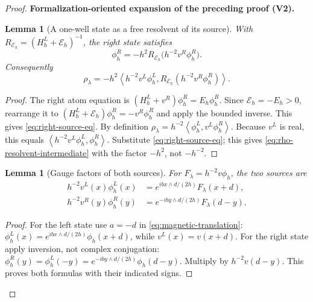 \documentclass[11pt]{article}
\newtheorem{lemma}[theorem]{Lemma}
\newcommand{\formalisationparentid}{X}
\newenvironment{formalisationaddition}[1]{\par\medskip\begingroup\color{blue}\def\formalisationparentid{#1}\setcounter{formalizationsublemma}{0}\let\lemma\formalizationsublemma\let\endlemma\endformalizationsublemma
  \def\Eo{\mathcal E_h^\circ}\def\EE{\mathcal E_h}\def\phio{\phi_h^\circ}\def\phih{\phi_h}\def\Ho{H_h^{\rm atom}(v^\circ)}\def\Ha{H_h^{\rm atom}}\def\HL{H_h^{L}}\def\Dh{D_h}\def\Log{\operatorname{Log}}\def\ellh{\ell_h}\def\Gp{G_{p,h}}\def\Ast{A_{*,h}}\def\ahat{\widehat{\mathfrak a}_h}\def\ah{\mathfrak a_h}\def\rh{\widehat\rho_h}\def\deltah{\widehat\delta_h}\def\oldref##1{\textup{(##1)}}\def\interface##1{\par\noindent\textit{Analytical interface used here.} ##1\par}\def\finish{\par\noindent\textit{Conclusion of the formalization-oriented expansion.} }\par\noindent\textbf{Formalization-oriented expansion of the preceding proof (V2).}\par\smallskip
}{\par\endgroup\medskip
}
\newcommand{\ip}[2]{\left\langle #1,#2\right\rangle}
\begin{document}
\begin{proof}
\begin{formalisationaddition}{P5.1}
\begin{lemma}[A one-well state as a free resolvent of its source]\label{sublemma:P5-1-source-resolvent}
With $R_{\mathcal E_h}=(\HL+\mathcal E_h)^{-1}$, the right state satisfies
\begin{equation*}
 \phi_h^R=-h^2R_{\mathcal E_h}\big(h^{-2}v^R\phi_h^R\big).
\end{equation*}
Consequently
\begin{equation*}
 \rho_\lambda=-h^2\ip{h^{-2}v^L\phi_h^L}
 {R_{\mathcal E_h}(h^{-2}v^R\phi_h^R)}.
\end{equation*}
\end{lemma}
\begin{proof}
The right atom equation is $(\HL+v^R)\phi_h^R=E_h\phi_h^R$. Since $\mathcal E_h=-E_h>0$, rearrange it to
$(\HL+\mathcal E_h)\phi_h^R=-v^R\phi_h^R$ and apply the bounded inverse. This gives \eqref{eq:right-source-eq}.
By definition $\rho_\lambda=h^{-2}\ip{\phi_h^L}{v^L\phi_h^R}$.
Because $v^L$ is real, this equals
$\ip{h^{-2}v^L\phi_h^L}{\phi_h^R}$. Substitute \eqref{eq:right-source-eq}; this gives \eqref{eq:rho-resolvent-intermediate} with the factor $-h^2$, not $-h^{-2}$.
\end{proof}

\begin{lemma}[Gauge factors of both sources]\label{sublemma:P5-1-gauge-sources}
For $F_\lambda=h^{-2}v\phih$, the two sources are
\begin{align*}
 h^{-2}v^L(x)\phi_h^L(x)
 &=e^{ibx\wedge d/(2h)}F_\lambda(x+d),\\
 h^{-2}v^R(y)\phi_h^R(y)
 &=e^{-iby\wedge d/(2h)}F_\lambda(d-y).
\end{align*}
\end{lemma}
\begin{proof}
For the left state use $a=-d$ in \eqref{eq:magnetic-translation}:
$\phi_h^L(x)=e^{ibx\wedge d/(2h)}\phih(x+d)$, while $v^L(x)=v(x+d)$.
For the right state apply inversion, not complex conjugation:
$\phi_h^R(y)=\phi_h^L(-y)=e^{-iby\wedge d/(2h)}\phih(d-y)$.
Multiply by $h^{-2}v(d-y)$. This proves both formulas with their indicated signs.
\end{proof}


\end{formalisationaddition}
\end{proof}
\end{document}
